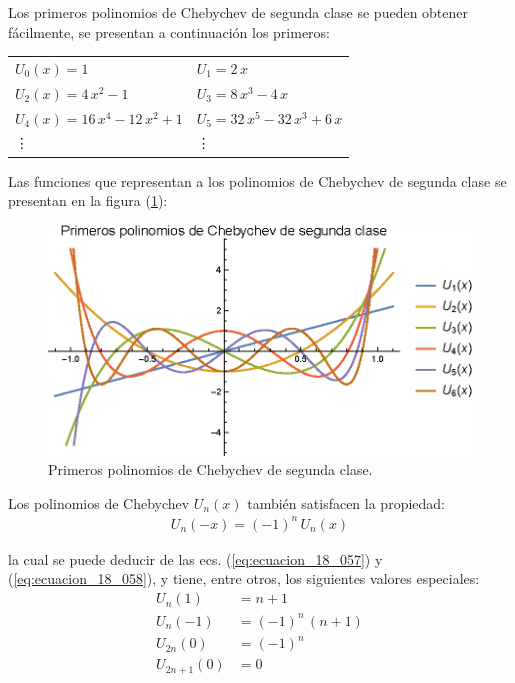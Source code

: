 Los primeros polinomios de Chebychev de segunda clase se pueden obtener fácilmente, se presentan a continuación los primeros:
\begin{table}[H]
\centering
\large
\begin{tabular}{p{6cm} p{6cm}}
$U_{0}(x) = 1$ & $U_{1} = 2 \, x$ \\[0.5em]
$U_{2}(x) = 4 \, x^{2} - 1$ & $U_{3} = 8 \, x^{3} - 4 \, x$ \\[0.5em]
$U_{4}(x) = 16 \, x^{4} - 12 \, x^{2} + 1$ & $U_{5} = 32 \, x^{5} - 32 \, x^{3} + 6 \, x$ \\[0.5em]
\vdots & \vdots
\end{tabular}
\end{table}

Las funciones que representan a los polinomios de Chebychev de segunda clase se presentan en la figura (\ref{fig:figura_plot_chebychev_02}):
\begin{figure}[H]
    \centering
    \includegraphics[scale=1.3]{Imagenes/Plot_Polinomios_Chebychev_02.eps}
    \caption{Primeros polinomios de Chebychev de segunda clase.}
    \label{fig:figura_plot_chebychev_02}
\end{figure}

Los polinomios de Chebychev $U_{n}(x)$ también satisfacen la propiedad:
\begin{align*}
U_{n} (-x) = (-1)^{n} \, U_{n} (x)
\end{align*}

la cual se puede deducir de las ecs. (\ref{eq:ecuacion_18_057}) y (\ref{eq:ecuacion_18_058}), y tiene, entre otros, los siguientes valores especiales:
\begin{align*}
U_{n} (1) &= n + 1 \\[0.5em]
U_{n} (-1) &= (-1)^{n} \, (n + 1) \\[0.5em]
U_{2n} (0) &= (-1)^{n} \\[0.5em]
U_{2n+1} (0) &= 0
\end{align*}

